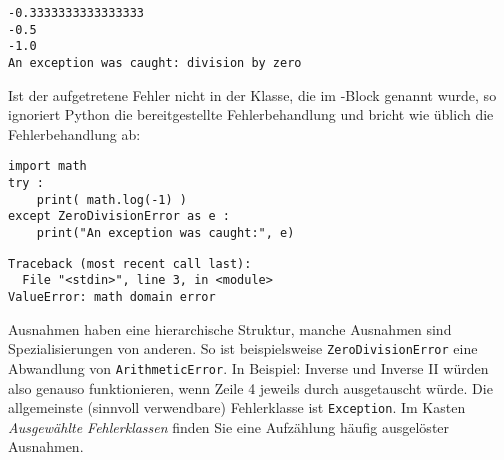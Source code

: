 \begin{cmdbox}
\begin{verbatim}
-0.3333333333333333
-0.5
-1.0
An exception was caught: division by zero
\end{verbatim}
\end{cmdbox}

Ist der aufgetretene Fehler nicht in der Klasse, die im -Block genannt wurde, so ignoriert Python die bereitgestellte Fehlerbehandlung und bricht wie üblich die Fehlerbehandlung ab:

\begin{codebox}
\begin{verbatim}
import math
try :
    print( math.log(-1) )
except ZeroDivisionError as e :
    print("An exception was caught:", e)
\end{verbatim}
\end{codebox}

\begin{cmdbox}
\begin{verbatim}
Traceback (most recent call last):
  File "<stdin>", line 3, in <module>
ValueError: math domain error
\end{verbatim}
\end{cmdbox}

Ausnahmen haben eine hierarchische Struktur, \ie manche Ausnahmen sind Spezialisierungen von anderen. So ist beispielsweise \texttt{ZeroDivisionError} eine Abwandlung von \texttt{ArithmeticError}. In Beispiel: Inverse und Inverse II würden also genauso funktionieren, wenn Zeile 4 jeweils durch  ausgetauscht würde. Die allgemeinste (sinnvoll verwendbare) Fehlerklasse ist \texttt{Exception}. Im Kasten \emph{Ausgewählte Fehlerklassen} finden Sie eine Aufzählung häufig ausgelöster Ausnahmen.

